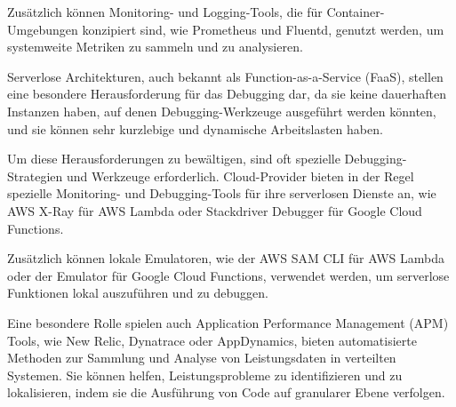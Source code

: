 Zusätzlich können Monitoring- und Logging-Tools, die für Container-Umgebungen konzipiert sind, wie Prometheus und Fluentd, genutzt werden, um systemweite Metriken zu sammeln und zu analysieren.


Serverlose Architekturen, auch bekannt als Function-as-a-Service (FaaS), stellen eine besondere Herausforderung für das Debugging dar, da sie keine dauerhaften Instanzen haben, auf denen Debugging-Werkzeuge ausgeführt werden könnten, und sie können sehr kurzlebige und dynamische Arbeitslasten haben.

Um diese Herausforderungen zu bewältigen, sind oft spezielle Debugging-Strategien und Werkzeuge erforderlich. Cloud-Provider bieten in der Regel spezielle Monitoring- und Debugging-Tools für ihre serverlosen Dienste an, wie AWS X-Ray für AWS Lambda oder Stackdriver Debugger für Google Cloud Functions.

Zusätzlich können lokale Emulatoren, wie der AWS SAM CLI für AWS Lambda oder der Emulator für Google Cloud Functions, verwendet werden, um serverlose Funktionen lokal auszuführen und zu debuggen.

Eine besondere Rolle spielen auch Application Performance Management (APM) Tools, wie New Relic, Dynatrace oder AppDynamics, bieten automatisierte Methoden zur Sammlung und Analyse von Leistungsdaten in verteilten Systemen. Sie können helfen, Leistungsprobleme zu identifizieren und zu lokalisieren, indem sie die Ausführung von Code auf granularer Ebene verfolgen.

